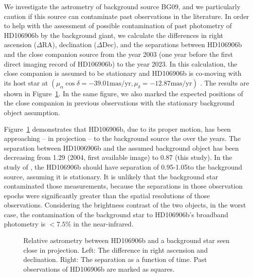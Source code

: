 \documentclass[twocolumn]{aastex62}
\begin{document}
We investigate the astrometry of background source BG09, and we particularly caution if this source can contaminate past observations in the literature.  In order to help with the assessment of possible contamination of past photometry of HD106906b by the background giant, we calculate  the differences in right ascension ($\Delta$RA),  declination ($\Delta$Dec), and the separations between HD106906b and the close companion source from the year 2003 (one year before the first direct imaging record of HD106906b) to the year 2023. In this calculation, the close companion is assumed to be stationary and HD106906b is co-moving with its host star at $(\mu_\alpha\cos\delta=-39.01 \mbox{mas/yr}, \mu_{\delta}=-12.87 \mbox{mas/yr})$ \citep{Gaia2016, Gaia2018}. The results are shown in Figure~\ref{fig:astrometry:bck}. In the same figure, we also marked the expected positions of the close companion in previous observations \citep{Bailey2013, Wu2016, Lagrange2016, Daemgen2017} with the stationary background object assumption.

Figure~\ref{fig:astrometry:bck} demonstrates that HD106906b, due to its proper motion, has been approaching  -- in projection -- to the background source the  over the years. The separation between HD1006906b and the assumed background object has been decreasing from 1\arcsec.29 (2004, first available image) to 0\arcsec.87 (this study). In the study of \citep{Bailey2013, Wu2016, Daemgen2017}, the HD106906b should have separation of 0.95\arcsec{}-1.05\arcsec to the background source, assuming it is stationary. It is unlikely that the background star contaminated those measurements, because the separations in those observation epochs were significantly greater than the spatial resolutions of those observations. Considering the brightness contrast of the two objects, in the worst case, the contamination of the background star to HD106906b's broadband photometry is  $<7.5\%$ in the near-infrared. 

\begin{figure}
  \centering
  \caption{Relative astrometry between HD106906b and a background star seen close in projection. Left: The difference in right ascension and declination. Right: The separation as a function of time. Past observations of HD106906b are marked as squares.}
  \label{fig:astrometry:bck}
\end{figure}

\end{document}

